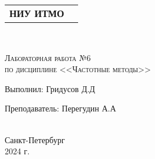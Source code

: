 

\begin{titlepage}
    \newpage
    \begin{center}
        \begin{tabular}{cc}
            \parbox{12cm}{\centering \textbf{НИУ ИТМО}} \\
            \\
            \hline
            \hline
        \end{tabular}
    \end{center}

    \begin{center}
        \\
    \end{center}

    \vspace{1cm}

    \begin{center}
        \textsc{Лабораторная работа №6 \\ по дисциплине <<Частотные методы>>}
    \end{center}

    \vspace{8em}

    \noindent Выполнил:  \hfill Гридусов Д.Д

    \vspace{20pt}
    \noindent Преподаватель: \hfill Перегудин А.А \\
    \\
    \vfill
    \begin{center}
        Санкт-Петербург \\2024 г.
    \end{center}

\end{titlepage}

\tableofcontents
\newpage

